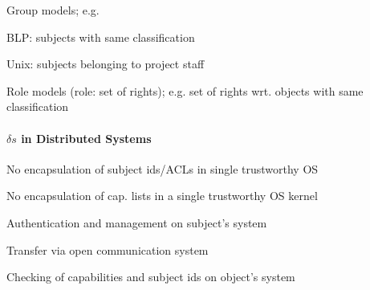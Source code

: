 \documentclass[a4paper]{article}
\begin{document}
\begin{multicols}{3}
    Group models; e.g.
    \begin{itemize*}
        \item BLP: subjects with same classification
        \item Unix: subjects belonging to project staff
    \end{itemize*}

    Role models (role: set of rights); e.g. set of rights wrt. objects with same classification

    \paragraph{$\delta s$ in Distributed Systems}
    \begin{itemize*}
        \item No encapsulation of subject ids/ACLs in single trustworthy OS
        \item No encapsulation of cap. lists in a single trustworthy OS kernel
        \begin{itemize*}
            \item Authentication and management on subject’s system
            \item Transfer via open communication system
            \item Checking of capabilities and subject ids on object’s system
        \end{itemize*}
    \end{itemize*}


\end{multicols}
\end{document}
